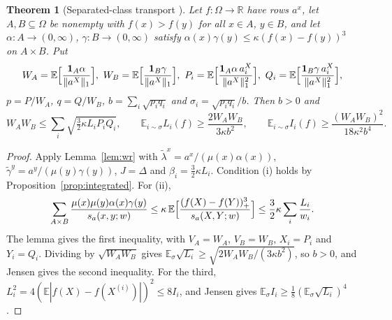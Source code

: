 \documentclass[11pt]{article}
\numberwithin{equation}{section}
\newtheorem{theorem}{Theorem}[section]
\theoremstyle{definition}
\theoremstyle{remark}
\newcommand{\E}{\mathbb{E}}
\newcommand{\R}{\mathbb{R}}
\newcommand{\1}{\mathbf 1}
\newcommand{\nrm}[1]{\lVert #1\rVert_1}
\begin{document}
\begin{theorem}[Separated-class transport {\cite{WriWIL}}]\label{thm:transport}
Let $f:\Omega\to\R$ have rows $a^x$, let $A,B\subseteq\Omega$ be nonempty with $f(x)>f(y)$ for all $x\in A$, $y\in B$, and let $\alpha:A\to(0,\infty)$, $\gamma:B\to(0,\infty)$ satisfy $\alpha(x)\gamma(y)\le\kappa(f(x)-f(y))^3$ on $A\times B$. Put
\[
W_A=\E\Bigl[\frac{\1_A\alpha}{\nrm{a^X}}\Bigr],\ W_B=\E\Bigl[\frac{\1_B\gamma}{\nrm{a^X}}\Bigr],\ P_i=\E\Bigl[\frac{\1_A\alpha\,a^X_i}{\nrm{a^X}^2}\Bigr],\ Q_i=\E\Bigl[\frac{\1_B\gamma\,a^X_i}{\nrm{a^X}^2}\Bigr],
\]
$p=P/W_A$, $q=Q/W_B$, $b=\sum_i\sqrt{p_iq_i}$ and $\sigma_i=\sqrt{p_iq_i}/b$. Then $b>0$ and
\[
W_AW_B\le\sum_i\sqrt{\tfrac32\kappa L_iP_iQ_i},\qquad \E_{i\sim\sigma}L_i(f)\ge\frac{2W_AW_B}{3\kappa b^2},\qquad \E_{i\sim\sigma}I_i(f)\ge\frac{(W_AW_B)^2}{18\kappa^2b^4}.
\]
\end{theorem}
\begin{proof}
Apply Lemma~\ref{lem:wr} with $\tilde\lambda^x=a^x/(\mu(x)\alpha(x))$, $\tilde\gamma^y=a^y/(\mu(y)\gamma(y))$, $J=\Delta$ and $\beta_i=\frac32\kappa L_i$. Condition (i) holds by Proposition~\ref{prop:integrated}. For (ii),
\[
\sum_{A\times B}\frac{\mu(x)\mu(y)\alpha(x)\gamma(y)}{s_a(x,y;w)}\le\kappa\,\E\Bigl[\frac{(f(X)-f(Y))_+^3}{s_a(X,Y;w)}\Bigr]\le\frac32\kappa\sum_i\frac{L_i}{w_i}.
\]
The lemma gives the first inequality, with $V_A=W_A$, $V_B=W_B$, $X_i=P_i$ and $Y_i=Q_i$. Dividing by $\sqrt{W_AW_B}$ gives $\E_\sigma\sqrt{L_i}\ge\sqrt{2W_AW_B/(3\kappa b^2)}$, so $b>0$, and Jensen gives the second inequality. For the third, $L_i^2=4(\E|f(X)-f(X^{(i)})|)^2\le8I_i$, and Jensen gives $\E_\sigma I_i\ge\frac18(\E_\sigma\sqrt{L_i})^4$.
\end{proof}
\end{document}
